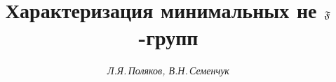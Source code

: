 









\newcommand{\FF}{\frak F}


\newcommand{\tts}[1]{}










\setcounter{page}{60}












\author{\it Л.Я.\,Поляков, В.Н.\,Семенчук}




\title{Характеризация минимальных не $\FF$-групп}









\date{}







\pagestyle{plain} %
















